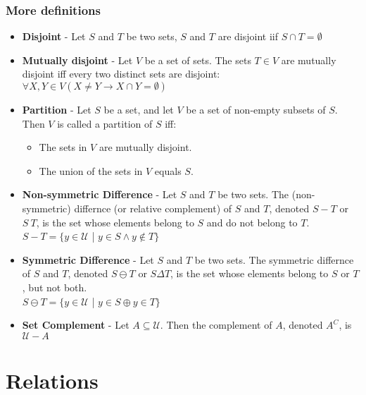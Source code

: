\documentclass[a4paper]{article}
\begin{document}
\subsubsection{More definitions}
\begin{itemize}
	\item \textbf{Disjoint} - Let $S$ and $T$ be two sets, $S$ and $T$ are disjoint iif $S\cap T = \emptyset$
	\item \textbf{Mutually disjoint} - Let $V$ be a set of sets. The sets $T\in V$ are mutually disjoint iff every two distinct sets are disjoint: 
	$\forall X,Y \in V (X \neq Y \rightarrow X\cap Y = \emptyset)$
	\item \textbf{Partition} - Let $S$ be a set, and let $V$ be a set of non-empty subsets of $S$. Then $V$ is called a partition of $S$ iff:
	\begin{itemize}
		\item The sets in $V$ are mutually disjoint.
		\item The union of the sets in $V$ equals $S$.
	\end{itemize}
	\item \textbf{Non-symmetric Difference} -  Let $S$ and $T$ be two sets. The (non-symmetric) differnce (or relative complement) of $S$ and $T$, denoted $S-T$ or $S \ T$, is the set whose elements belong to $S$ and do not belong to $T$.\\
	$S-T = \{y \in \mathcal{U}$ | $ y\in S \land y \notin T\}$
	\item \textbf{Symmetric Difference} - Let $S$ and $T$ be two sets. The symmetric differnce of $S$ and $T$, denoted $S\ominus T$ or $S \Delta T$, is the set whose elements belong to $S$ or $T$, but not both.\\
	$S\ominus T = \{y \in \mathcal{U}$ | $ y\in S \oplus y \in T\}$
	\item \textbf{Set Complement} - Let $A \subseteq \mathcal{U}$. Then the complement of $A$, denoted $A^C$, is $\mathcal{U}-A$ 
\end{itemize}

\section{Relations}
\end{document}
